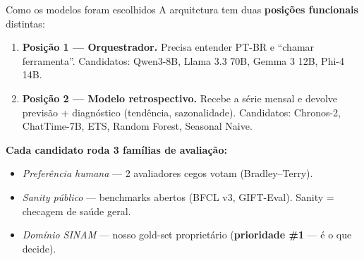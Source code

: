 \documentclass[10pt,aspectratio=169]{beamer}
\begin{document}
\begin{frame}{Como os modelos foram escolhidos}
A arquitetura tem duas \textbf{posições funcionais} distintas:

\begin{enumerate}\setlength\itemsep{0.3em}
\item \textbf{Posição 1 --- Orquestrador.} Precisa entender PT-BR e
``chamar ferramenta''. Candidatos: Qwen3-8B, Llama 3.3 70B, Gemma 3
12B, Phi-4 14B.

\item \textbf{Posição 2 --- Modelo retrospectivo.} Recebe a série
mensal e devolve previsão + diagnóstico (tendência, sazonalidade).
Candidatos: Chronos-2, ChatTime-7B, ETS, Random Forest, Seasonal Naive.
\end{enumerate}

\vspace{0.4em}
\textbf{Cada candidato roda 3 famílias de avaliação:}
\begin{itemize}\small
\item \emph{Preferência humana} --- 2 avaliadores cegos votam (Bradley--Terry).
\item \emph{Sanity público} --- benchmarks abertos (BFCL v3, GIFT-Eval).
Sanity = checagem de saúde geral.
\item \emph{Domínio SINAM} --- nosso gold-set proprietário
(\textbf{prioridade \#1} --- é o que decide).
\end{itemize}
\end{frame}
\end{document}
